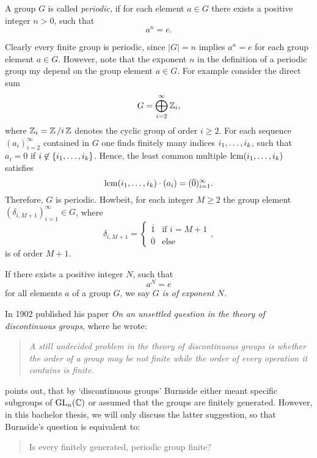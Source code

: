 \begin{defin}
A group $G$ is called \emph{periodic,} if for each element $a\in G$ there exists a positive integer $n>0$, such that
\begin{equation*}
a^n=e.
\end{equation*}
\end{defin}
Clearly every finite group is periodic, since $\lvert G\rvert=n$ implies $a^n=e$ for each group element $a\in G$. However, note that the exponent $n$ in the definition of a periodic group my depend on the group element $a\in G$. For example consider the direct sum
\begin{equation*}
G=\bigoplus_{i=2}^\infty \Z_i,
\end{equation*}
where $\Z_i=\nicefrac{\Z}{i\Z}$ denotes the cyclic group of order $i\geq 2$. For each sequence $(a_i)_{i=2}^\infty$ contained in $G$ one finds finitely many indices $\seq[k]{i}$, such that $a_i=0$ if $i\not\in\lbrace\seq[k]{i}\rbrace$. Hence, the least common multiple $\lcm(\seq[k]{i})$ satisfies
\begin{equation*}
\lcm(\seq[k]{i})\cdot(a_i)=(\overline{0})_{i=1}^\infty.
\end{equation*}
Therefore, $G$ is periodic. Howbeit, for each integer $M\geq 2$ the group element $(\delta_{i,M+1})_{i=1}^\infty\in G$, where
\begin{equation*}
\delta_{i,M+1}=\begin{cases} \overline{1} &\text{if }i=M+1\\ \overline{0}&\text{else}\end{cases},
\end{equation*}
is of order $M+1$.

If there exists a positive integer $N$, such that
\begin{equation*}
a^N=e
\end{equation*}
for all elements $a$ of a group $G$, we say $G$ \emph{is of exponent $N$.}

In 1902 \textcite{burnside1902} published his paper \emph{On an unsettled question in the theory of discontinuous groups}, where he wrote:
\begin{quotation}
\itshape%
A still undecided problem in the theory of discontinuous groups is whether the order of a group may be not finite while the order of every operation it contains is finite.
\end{quotation}

\textcite{newman2004still} points out, that by `discontinuous groups' Burnside either meant specific subgroups of $\mathrm{GL}_n(\C)$ or assumed that the groups are finitely generated. However, in this bachelor thesis, we will only discuss the latter suggestion, so that Burnside's question is equivalent to:
\begin{quotation}
Is every finitely generated, periodic group finite?
\end{quotation}

